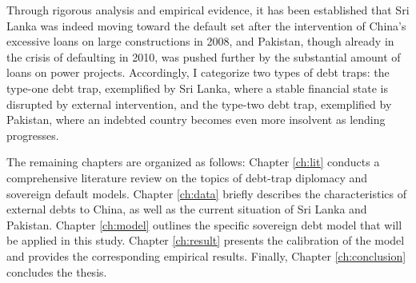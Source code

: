 Through rigorous analysis and empirical evidence, it has been established that
Sri Lanka was indeed moving toward the default set after the intervention of China's excessive loans on large constructions in 2008, and Pakistan, though already in the crisis of defaulting in 2010, was pushed further by the substantial amount of loans on power projects.
Accordingly, I categorize two types of debt traps: the type-one debt trap, exemplified by Sri Lanka, where a stable financial state is disrupted by external intervention, and the type-two debt trap, exemplified by Pakistan, where an indebted country becomes even more insolvent as lending progresses.

The remaining chapters are organized as follows:
Chapter \ref{ch:lit} conducts a comprehensive literature review on the topics of debt-trap diplomacy and sovereign default models.
Chapter \ref{ch:data} briefly describes the characteristics of external debts to China, as well as the current situation of Sri Lanka and Pakistan.
Chapter \ref{ch:model} outlines the specific sovereign debt model that will be applied in this study.
Chapter \ref{ch:result} presents the calibration of the model and provides the corresponding empirical results.
Finally, Chapter \ref{ch:conclusion} concludes the thesis.


